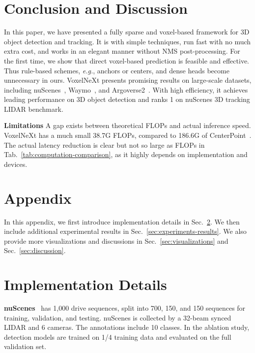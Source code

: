 \documentclass[10pt,twocolumn,letterpaper]{article}
\begin{document}
{\section{Conclusion and Discussion}
\label{sec:conclusion}
In this paper, we have presented a fully sparse and voxel-based framework for 3D object detection and tracking. It is with simple techniques, run fast with no much extra cost, and works in an elegant manner without NMS post-processing. For the first time, we show that direct voxel-based prediction is feasible and effective. Thus rule-based schemes, {\em e.g.}, anchors or centers, and dense heads become unnecessary in ours. VoxelNeXt presents promising results on large-scale datasets, including nuScenes~\cite{nuscenes}, Waymo~\cite{waymo}, and Argoverse2~\cite{argo2}. With high efficiency, it achieves leading performance on 3D object detection and ranks 1 on nuScenes 3D tracking LIDAR benchmark.

\vspace{0.35em}
\noindent
\textbf{Limitations}
A gap exists between theoretical FLOPs and actual inference speed.
VoxelNeXt has a much small 38.7G FLOPs, compared to 186.6G of CenterPoint~\cite{centerpoint}. The actual latency reduction is clear but not so large as FLOPs in Tab.~\ref{tab:computation-comparison}, as it highly depends on implementation and devices.

{\small


}


\appendix
{}

\section*{Appendix}
In this appendix, we first introduce implementation details in Sec.~\ref{sec:implementation-details}. We then include additional experimental results in Sec.~\ref{sec:experiments-results}. We also provide more visualizations and discussions in Sec.~\ref{sec:visualizations} and Sec.~\ref{sec:discussion}. 

\section{Implementation Details}
\label{sec:implementation-details}

\noindent
\textbf{nuScenes}~\cite{nuscenes} has 1,000 drive sequences, split into 700, 150, and 150 sequences for training, validation, and testing. nuScenes is collected by a 32-beam synced LIDAR and 6 cameras. The annotations include 10 classes. In the ablation study, detection models are trained on 1/4 training data and evaluated on the full validation set. 

}
\end{document}
